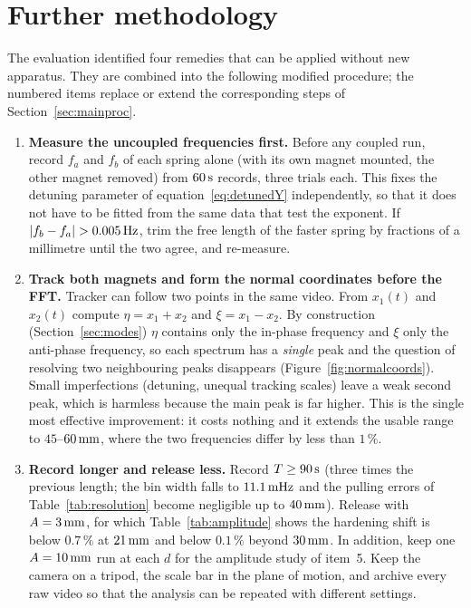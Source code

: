 \section{Further methodology}\label{sec:further}

The evaluation identified four remedies that can be applied without new apparatus. They are combined into the following modified procedure; the numbered items replace or extend the corresponding steps of Section~\ref{sec:mainproc}.

\begin{enumerate}
\item \textbf{Measure the uncoupled frequencies first.} Before any coupled run, record $f_a$ and $f_b$ of each spring alone (with its own magnet mounted, the other magnet removed) from $60\,\mathrm{s}$ records, three trials each. This fixes the detuning parameter of equation~\eqref{eq:detunedY} independently, so that it does not have to be fitted from the same data that test the exponent. If $|f_b-f_a|>0.005\un{Hz}$, trim the free length of the faster spring by fractions of a millimetre until the two agree, and re-measure.

\item \textbf{Track both magnets and form the normal coordinates before the FFT.} Tracker can follow two points in the same video. From $x_1(t)$ and $x_2(t)$ compute $\eta=x_1+x_2$ and $\xi=x_1-x_2$. By construction (Section~\ref{sec:modes}) $\eta$ contains only the in-phase frequency and $\xi$ only the anti-phase frequency, so each spectrum has a \emph{single} peak and the question of resolving two neighbouring peaks disappears (Figure~\ref{fig:normalcoords}). Small imperfections (detuning, unequal tracking scales) leave a weak second peak, which is harmless because the main peak is far higher. This is the single most effective improvement: it costs nothing and it extends the usable range to $45$--$60\,\mathrm{mm}$, where the two frequencies differ by less than $1\,\%$.

\item \textbf{Record longer and release less.} Record $T\geq90\,\mathrm{s}$ (three times the previous length; the bin width falls to $11.1\,\mathrm{mHz}$ and the pulling errors of Table~\ref{tab:resolution} become negligible up to $40\,\mathrm{mm}$). Release with $A=3\,\mathrm{mm}$, for which Table~\ref{tab:amplitude} shows the hardening shift is below $0.7\,\%$ at $21\,\mathrm{mm}$ and below $0.1\,\%$ beyond $30\,\mathrm{mm}$. In addition, keep one $A=10\,\mathrm{mm}$ run at each $d$ for the amplitude study of item~5. Keep the camera on a tripod, the scale bar in the plane of motion, and archive every raw video so that the analysis can be repeated with different settings.


\end{enumerate}
